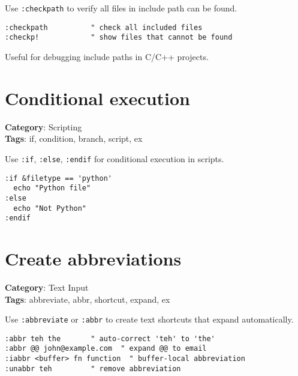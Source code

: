 {{{{{{Use {\footnotesize \Verb§:checkpath§} to verify all files in include path can be found.

\begin{Exa*}{}
\begin{Verbatim}[fontsize=\footnotesize, breaklines, breakanywhere]
:checkpath          " check all included files
:checkp!            " show files that cannot be found
\end{Verbatim}
\end{Exa*}

Useful for debugging include paths in C/C++ projects.

\section{Conditional execution}

\textbf{Category}: Scripting\\ \textbf{Tags}: if, condition, branch, script, ex
\vspace{0.5cm}

Use {\footnotesize \Verb§:if§}, {\footnotesize \Verb§:else§}, {\footnotesize \Verb§:endif§} for conditional execution in scripts.

\begin{Exa*}{}
\begin{Verbatim}[fontsize=\footnotesize, breaklines, breakanywhere]
:if &filetype == 'python'
  echo "Python file"
:else
  echo "Not Python"
:endif
\end{Verbatim}
\end{Exa*}

\section{Create abbreviations}

\textbf{Category}: Text Input\\ \textbf{Tags}: abbreviate, abbr, shortcut, expand, ex
\vspace{0.5cm}

Use {\footnotesize \Verb§:abbreviate§} or {\footnotesize \Verb§:abbr§} to create text shortcuts that expand automatically.

\begin{Exa*}{}
\begin{Verbatim}[fontsize=\footnotesize, breaklines, breakanywhere]
:abbr teh the       " auto-correct 'teh' to 'the'
:abbr @@ john@example.com  " expand @@ to email
:iabbr <buffer> fn function  " buffer-local abbreviation
:unabbr teh         " remove abbreviation
\end{Verbatim}
\end{Exa*}

}}}}}}
